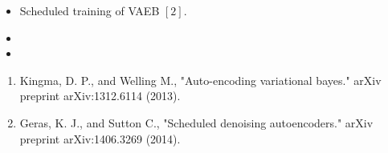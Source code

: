\documentclass[landscape,a0b,final,a4resizeable]{include/a0poster}
\begin{document}
\begin{poster}
\begin{multicols}{3}
\vspace{0.5em}


\begin{itemize}
\item Scheduled training of VAEB $[2]$.
\item
\item 
\end{itemize}

\vspace{0.5em}

\begin{enumerate}
\item Kingma, D. P., and  Welling M., "Auto-encoding variational bayes." arXiv preprint arXiv:1312.6114 (2013).
\item Geras, K. J., and Sutton C., "Scheduled denoising autoencoders." arXiv preprint arXiv:1406.3269 (2014).
\end{enumerate}

\end{multicols}
\end{poster}
\end{document}
